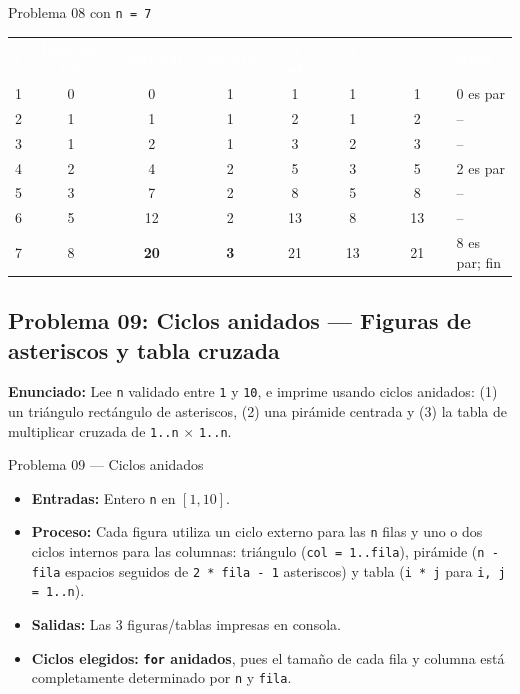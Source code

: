 \documentclass[11pt,letterpaper]{article}
\begin{document}
\begin{pruebaescritorio}{Problema 08 con \texttt{n = 7}}
\begin{center}
\footnotesize
\setlength{\tabcolsep}{4pt}
\renewcommand{\arraystretch}{1.15}
\begin{tabularx}{\linewidth}{c c c c c c c X}
\rowcolor{AzulMarino}
\textcolor{white}{\texttt{i}} & \textcolor{white}{\textbf{Imprime (\texttt{a})}} & \textcolor{white}{\texttt{sumaTotal}} & \textcolor{white}{\texttt{cantPares}} & \textcolor{white}{\texttt{sig = a+b}} & \textcolor{white}{\texttt{a} (nuevo)} & \textcolor{white}{\texttt{b} (nuevo)} & \textcolor{white}{\textbf{Nota}} \\
1 & 0 & 0 & 1 & 1 & 1 & 1 & 0 es par \\
2 & 1 & 1 & 1 & 2 & 1 & 2 & -- \\
3 & 1 & 2 & 1 & 3 & 2 & 3 & -- \\
4 & 2 & 4 & 2 & 5 & 3 & 5 & 2 es par \\
5 & 3 & 7 & 2 & 8 & 5 & 8 & -- \\
6 & 5 & 12 & 2 & 13 & 8 & 13 & -- \\
7 & 8 & \textbf{20} & \textbf{3} & 21 & 13 & 21 & 8 es par; fin \\
\bottomrule
\end{tabularx}
\end{center}
\end{pruebaescritorio}

\subsection{Problema 09: Ciclos anidados --- Figuras de asteriscos y tabla cruzada}

\textbf{Enunciado:} Lee \texttt{n} validado entre \texttt{1} y \texttt{10}, e imprime usando ciclos anidados: (1) un triángulo rectángulo de asteriscos, (2) una pirámide centrada y (3) la tabla de multiplicar cruzada de \texttt{1..n} $\times$ \texttt{1..n}.

\begin{analisis}{Problema 09 --- Ciclos anidados}
\begin{itemize}
  \item \textbf{Entradas:} Entero \texttt{n} en $[1, 10]$.
  \item \textbf{Proceso:} Cada figura utiliza un ciclo externo para las \texttt{n} filas y uno o dos ciclos internos para las columnas: triángulo (\texttt{col = 1..fila}), pirámide (\texttt{n - fila} espacios seguidos de \texttt{2 * fila - 1} asteriscos) y tabla (\texttt{i * j} para \texttt{i, j = 1..n}).
  \item \textbf{Salidas:} Las 3 figuras/tablas impresas en consola.
  \item \textbf{Ciclos elegidos:} \textbf{\texttt{for} anidados}, pues el tamaño de cada fila y columna está completamente determinado por \texttt{n} y \texttt{fila}.
\end{itemize}
\end{analisis}
\end{document}
